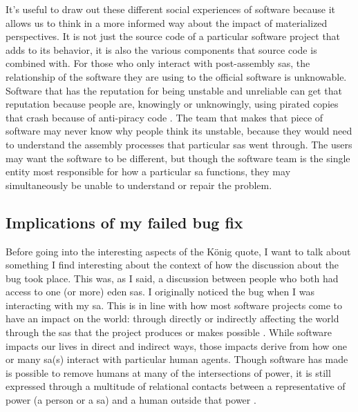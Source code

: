 \documentclass[a4paper,man,natbib,floatsintext]{apa6}
\begin{document}
   It's useful to draw out these different social experiences of software because it allows us to think in a more informed way about the impact of materialized perspectives. It is not just the source code of a particular software project that adds to its behavior, it is also the various components that source code is combined with. For those who only interact with post-assembly \glspl{sa}, the relationship of the software they are using to the official software is unknowable. Software that has the reputation for being unstable and unreliable can get that reputation because people are, knowingly or unknowingly, using pirated copies that crash because of anti-piracy code \citep{Fitch2008-vq}. The team that makes that piece of software may never know why people think its unstable, because they would need to understand the assembly processes that particular \glspl{sa} went through. The users may want the software to be different, but though the software team is the single entity most responsible for how a particular \gls{sa} functions, they may simultaneously be unable to understand or repair the problem.


   \subsection{Implications of my failed bug fix}
   Before going into the interesting aspects of the K{\"o}nig quote, I want to talk about something I find interesting about the context of how the discussion about the bug took place. This was, as I said, a discussion between people who both had access to one (or more) \acrshort{eden} \glspl{sa}. I originally noticed the bug when I was interacting with my \gls{sa}. This is in line with how most software projects come to have an impact on the world: through directly or indirectly affecting the world through the \glspl{sa} that the project produces or makes possible \citep{Kitchin2011-af}. While software impacts our lives in direct and indirect ways, those impacts derive from how one or many \gls{sa}(s) interact with particular human agents. Though software has made is possible to remove humans at many of the intersections of power, it is still expressed through a multitude of relational contacts between a representative of power (a person or a \gls{sa}) and a human outside that power \citet{Cheney-Lippold2018-lw,Deluze1995-eo}. 
\end{document}
